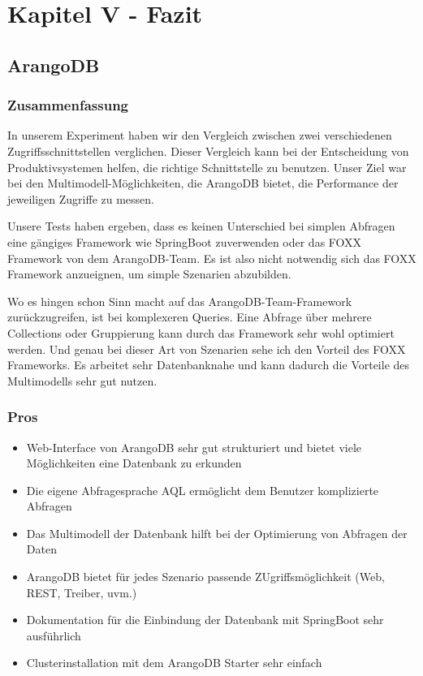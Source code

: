 \chapter{Kapitel V - Fazit}
\section{ArangoDB}

\subsection{Zusammenfassung}
In unserem Experiment haben wir den Vergleich zwischen zwei verschiedenen Zugriffsschnittstellen verglichen. Dieser Vergleich kann bei der Entscheidung von Produktivsystemen helfen, die richtige Schnittstelle zu benutzen. 
Unser Ziel war bei den Multimodell-Möglichkeiten, die ArangoDB bietet, die Performance der jeweiligen Zugriffe zu messen. 

Unsere Tests haben ergeben, dass es keinen Unterschied bei simplen Abfragen eine gängiges Framework wie SpringBoot zuverwenden oder das FOXX Framework von dem ArangoDB-Team. Es ist also nicht notwendig sich das FOXX Framework anzueignen, um simple Szenarien abzubilden.

Wo es hingen schon Sinn macht auf das ArangoDB-Team-Framework zurückzugreifen, ist bei komplexeren Queries. Eine Abfrage über mehrere Collections oder Gruppierung kann durch das Framework sehr wohl optimiert werden. Und genau bei dieser Art von Szenarien sehe ich den Vorteil des FOXX Frameworks. Es arbeitet sehr Datenbanknahe und kann dadurch die Vorteile des Multimodells sehr gut nutzen.
\subsection{Pros}
\begin{itemize}
\item Web-Interface von ArangoDB sehr gut strukturiert und bietet viele Möglichkeiten eine Datenbank zu erkunden
\item Die eigene Abfragesprache \ac{AQL} ermöglicht dem Benutzer komplizierte Abfragen
\item Das Multimodell der Datenbank hilft bei der Optimierung von Abfragen der Daten
\item ArangoDB bietet für jedes Szenario passende ZUgriffsmöglichkeit (Web, REST, Treiber, uvm.)
\item Dokumentation für die Einbindung der Datenbank mit SpringBoot sehr ausführlich
\item Clusterinstallation mit dem ArangoDB Starter sehr einfach
\end{itemize}
